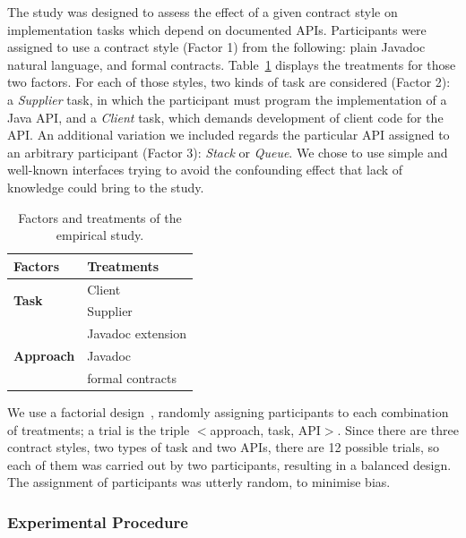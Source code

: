 The study was designed to assess the effect of a given contract style on implementation tasks which depend on documented APIs. 
Participants were assigned to use a contract style (Factor 1) from the following: plain Javadoc natural language, \contractjdoc{} and formal contracts. Table~\ref{tab:factorsEmpStudy} displays the treatments for those two factors.
For each of those styles, two kinds of task are considered (Factor 2): a \textit{Supplier} task, in which the participant must program the implementation of a Java API, and a \textit{Client} task, which demands development of client code for the API.
An additional variation we included regards the particular API assigned to an arbitrary participant (Factor 3): \textit{Stack} or \textit{Queue}. We chose to use simple and well-known interfaces trying to avoid the confounding effect that lack of knowledge could bring to the study.


\begin{table}[ht]
\caption{Factors and treatments of the empirical study.}
\label{tab:factorsEmpStudy}
\centering
\begin{tabular}{ll} \toprule
\bfseries Factors & \bfseries Treatments \\
\hline

\multirow{2}{*}{\textbf{Task}} & Client \\
& Supplier \\ \hline 

\multirow{3}{*}{\textbf{Approach}} & Javadoc extension \\
 & Javadoc \\
& formal contracts \\ \bottomrule
\end{tabular}
\end{table}

We use a factorial design~\cite{wohlin}, randomly assigning participants to each combination of treatments; a trial is the triple $<$approach, task, API$>$.
Since there are three contract styles, two types of task and two APIs, there are 12 possible trials, so each of them was carried out by two participants, resulting in a balanced design. 
The assignment of participants was utterly random, to minimise bias.

\subsubsection{Experimental Procedure}
\label{sec:expProcedure}

